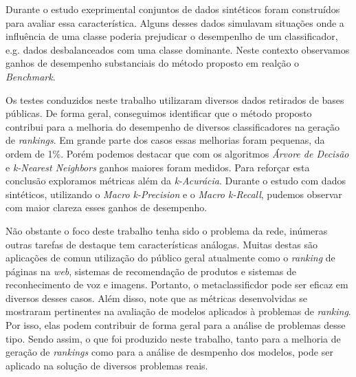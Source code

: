 Durante o estudo exeprimental conjuntos de dados sintéticos foram construídos para avaliar essa característica.
Alguns desses dados simulavam situações onde a influência de uma classe poderia prejudicar o desempenlho de um classificador, e.g. dados desbalanceados com uma classe dominante.
Neste contexto observamos ganhos de desempenho substanciais do método proposto em realção o \textit{Benchmark}.

Os testes conduzidos neste trabalho utilizaram diversos dados retirados de bases públicas.
De forma geral, conseguimos identificar que o método proposto contribui para a melhoria do desempenho de diversos classificadores na geração de \textit{rankings}.
Em grande parte dos casos essas melhorias foram pequenas, da ordem de 1\%.
Porém podemos destacar que com os algoritmos \textit{Árvore de Decisão} e \textit{k-Nearest Neighbors} ganhos maiores foram medidos.
Para reforçar esta conclusão exploramos métricas além da \textit{k-Acurácia}.
Durante o estudo com dados sintéticos, utilizando o \textit{Macro k-Precision} e o \textit{Macro k-Recall}, pudemos observar com maior clareza esses ganhos de desempenho.

Não obstante o foco deste trabalho tenha sido o problema da rede, inúmeras outras tarefas de destaque tem características análogas.
Muitas destas são aplicações de comun utilização do público geral atualmente como o \textit{ranking} de páginas na \textit{web}, sistemas de recomendação de produtos e sistemas de reconhecimento de voz e imagens.
Portanto, o metaclassificdor pode ser eficaz em diversos desses casos.
Além disso, note que as métricas desenvolvidas se mostraram pertinentes na avaliação de modelos aplicados à problemas de \textit{ranking}.
Por isso, elas podem contribuir de forma geral para a análise de problemas desse tipo.
Sendo assim, o que foi produzido neste trabalho, tanto para a melhoria de geração de \textit{rankings} como para a análise de desmpenho dos modelos, pode ser aplicado na solução de diversos problemas reais.
